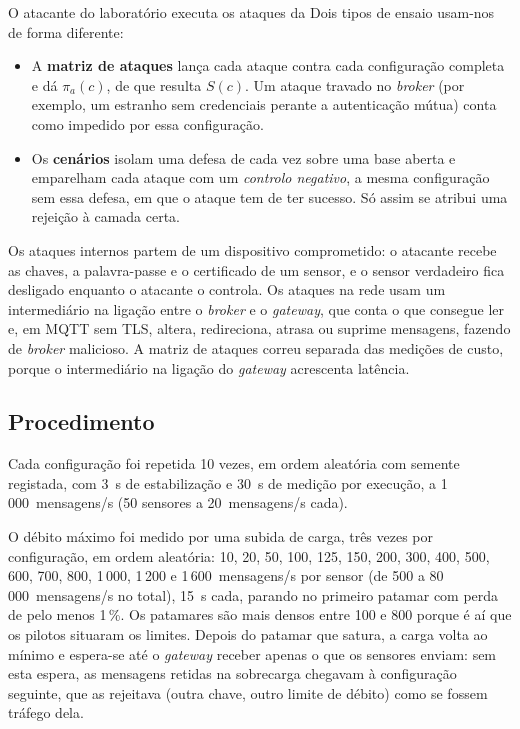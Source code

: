 O atacante do laboratório executa os ataques da  Dois
tipos de ensaio usam-nos de forma diferente:

\begin{itemize}[leftmargin=*]
  \item A \textbf{matriz de ataques} lança cada ataque contra cada configuração
    completa e dá $\pi_a(c)$, de que resulta $S(c)$. Um ataque travado no
    \emph{broker} (por exemplo, um estranho sem credenciais perante a autenticação
    mútua) conta como impedido por essa configuração.
  \item Os \textbf{cenários} isolam uma defesa de cada vez sobre uma base aberta e
    emparelham cada ataque com um \emph{controlo negativo}, a mesma configuração sem
    essa defesa, em que o ataque tem de ter sucesso. Só assim se atribui uma
    rejeição à camada certa.
\end{itemize}

Os ataques internos partem de um dispositivo comprometido: o atacante recebe as
chaves, a palavra-passe e o certificado de um sensor, e o sensor verdadeiro fica
desligado enquanto o atacante o controla. Os ataques na rede usam um intermediário
na ligação entre o \emph{broker} e o \emph{gateway}, que conta o que consegue ler
e, em MQTT sem TLS, altera, redireciona, atrasa ou suprime mensagens, fazendo de
\emph{broker} malicioso. A matriz de ataques correu separada das medições de
custo, porque o intermediário na ligação do \emph{gateway} acrescenta latência.

\subsection{Procedimento}

Cada configuração foi repetida 10 vezes, em ordem aleatória com semente
registada, com 3~s de estabilização e 30~s de medição por execução, a
1\,000~mensagens/s (50 sensores a 20~mensagens/s cada).

O débito máximo foi medido por uma subida de carga, três vezes por configuração,
em ordem aleatória: 10, 20, 50, 100, 125, 150, 200, 300, 400, 500, 600, 700, 800,
1\,000, 1\,200 e 1\,600~mensagens/s por sensor (de 500 a 80\,000~mensagens/s no
total), 15~s cada, parando no primeiro patamar com perda de pelo menos 1\,\%. Os
patamares são mais densos entre 100 e 800 porque é aí que os pilotos situaram os
limites. Depois do patamar que satura, a carga volta ao mínimo e espera-se até o
\emph{gateway} receber apenas o que os sensores enviam: sem esta espera, as
mensagens retidas na sobrecarga chegavam à configuração seguinte, que as rejeitava
(outra chave, outro limite de débito) como se fossem tráfego dela.

